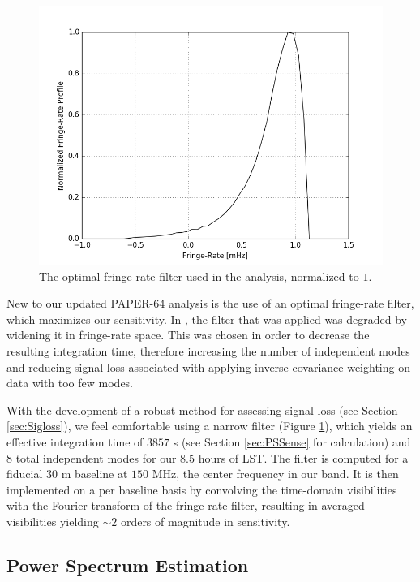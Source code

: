\documentclass[preprint2,numberedappendix,tighten,twocolappendix]{aastex6}  %
\begin{document}
\begin{figure}
	\centering
	\includegraphics[width=\columnwidth]{plots/frp.png}
	\caption{The optimal fringe-rate filter used in the analysis, normalized to $1$.}
	\label{fig:frp}
\end{figure}

New to our updated PAPER-64 analysis is the use of an optimal fringe-rate filter, which maximizes our sensitivity. In \citet{ali_et_al2015}, the filter that was applied was degraded by widening it in fringe-rate space. This was chosen in order to decrease the resulting integration time, therefore increasing the number of independent modes and reducing signal loss associated with applying inverse covariance weighting on data with too few modes.

With the development of a robust method for assessing signal loss (see Section \ref{sec:Sigloss}), we feel comfortable using a narrow filter (Figure \ref{fig:frp}), which yields an effective integration time of $3857$ s (see Section \ref{sec:PSSense} for calculation) and $8$ total independent modes for our $8.5$ hours of LST. The filter is computed for a fiducial $30$ m baseline at $150$ MHz, the center frequency in our band. It is then implemented on a per baseline basis by convolving the time-domain visibilities with the Fourier transform of the fringe-rate filter, resulting in averaged visibilities yielding $\sim 2$ orders of magnitude in sensitivity. 

\subsection{Power Spectrum Estimation}
\label{sec:PS}
\end{document}

